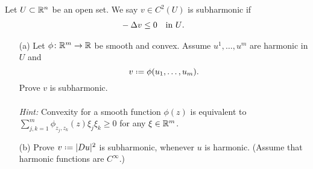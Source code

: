 \begin{problem}
  Let \(U\subset\R^n\) be an open set. We say \(v \in C^2(U)\) is
  subharmonic if
  \[
    \begin{aligned}
      &-\Delta v\leq 0&&\text{in \(U\).}
    \end{aligned}
  \]
  \begin{itemize}
  \item[(a)] Let \(\phi\colon\R^m\to\R\) be smooth and
    convex. Assume \(u^1,\dotsc,u^m\) are harmonic in \(U\) and
    \[
      v\defeq\phi(u_1,\dotsc,u_m).
    \]
    Prove \(v\) is subharmonic.
    \\\\
    \emph{Hint:} Convexity for a smooth function \(\phi(z)\) is
    equivalent to \(\sum_{j,k=1}^m\phi_{z_j,z_k}(z)\xi_j\xi_k\geq 0\)
    for any \(\xi\in\mathbb{R}^m\).
  \item[(b)] Prove \(v\defeq|Du|^2\) is subharmonic, whenever \(u\) is
    harmonic. (Assume that harmonic functions are \(C^\infty\).)
  \end{itemize}
\end{problem}
